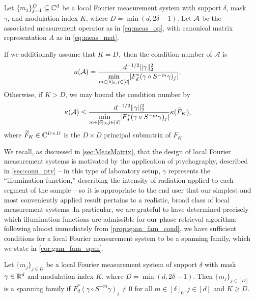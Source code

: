 \begin{proposition}
  Let $\{m_j\}_{j = 1}^D \subseteq \mathbb{C}^d$ be a local Fourier measurement system with support $\delta$, mask $\gamma$, and modulation index $K$, where $D = \min(d, 2 \delta - 1)$.  Let $\mathcal{A}$ be the associated measurement operator as in \eqref{eq:meas_op}, with canonical matrix representation $A$ as in \eqref{eq:meas_mat}.

If we additionally assume that $K = D,$ then the condition number of $\mathcal{A}$ is \begin{equation}\kappa(\mathcal{A}) = \dfrac{d^{-1/2} \lVert\gamma\rVert_2^2}{\min\limits_{m \in [\delta]_0, j \in [d]} \lvert F_d^* (\gamma \circ S^{-m} \gamma)_j \rvert}.\label{eq:clean_cond}\end{equation}  Otherwise, if $K > D$, we may bound the condition number by \begin{equation}\kappa(\mathcal{A}) \le \dfrac{d^{-1/2} \lVert\gamma\rVert_2^2}{\min\limits_{m \in [\delta]_0, j \in [d]} \lvert F_d^* (\gamma \circ S^{-m} \gamma)_j \rvert} \kappa(\widetilde{F}_K), \label{eq:messy_cond}\end{equation} where $\widetilde{F}_K \in \mathbb{C}^{D \times D}$ is the $D \times D$ principal submatrix of $F_K$.
\label{prop:span_fam_cond}
\label{prop:gam_fam_cond}
\end{proposition}

We recall, as discussed in \cref{sec:MeasMatrix}, that the design of local Fourier measurement systems is motivated by the application of ptychography, described in \cref{sec:conn_pty} -- in this type of laboratory setup, $\gamma$ represents the ``illumination function,'' describing the intensity of radiation applied to each segment of the sample -- so it is appropriate to the end user that our simplest and most conveniently applied result pertains to a realistic, broad class of local measurement systems.  In particular, we are grateful to have determined precisely which illumination functions are admissible for our phase retrieval algorithm: following almost immediately from \cref{prop:span_fam_cond}, we have sufficient conditions for a local Fourier measurement system to be a spanning family, which we state in \cref{cor:gam_fam_span}.
\begin{corollary}
  Let $\{m_j\}_{j \in D}$ be a local Fourier measurement system of support $\delta$ with mask $\gamma \in \mathbb{R}^d$ and modulation index $K$, where $D = \min(d, 2 \delta - 1)$.  Then $\{m_j\}_{j \in [D]}$ is a spanning family if $F_d^*(\gamma \circ S^{-m} \gamma)_j \neq 0$ for all $m \in [\delta]_0, j \in [d]$ and $K \ge D$.
  \label{cor:gam_fam_span}
\end{corollary}

